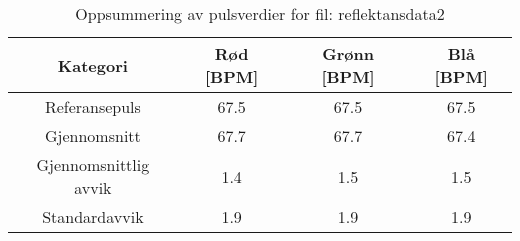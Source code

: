 
\begin{table}[H]
\centering
\caption{Oppsummering av pulsverdier for fil: reflektansdata2}
\label{tab:reflektansdata2\_summary}
\begin{tabular}{|c|c|c|c|}
\hline
\textbf{Kategori} & \textbf{Rød [BPM]} & \textbf{Grønn [BPM]} & \textbf{Blå [BPM]} \\ \hline
Referansepuls & 67.5 & 67.5 & 67.5 \\ \hline
Gjennomsnitt & 67.7 & 67.7 & 67.4 \\ \hline
Gjennomsnittlig avvik & 1.4 & 1.5 & 1.5 \\ \hline
Standardavvik & 1.9 & 1.9 & 1.9 \\ \hline
\end{tabular}
\end{table}

